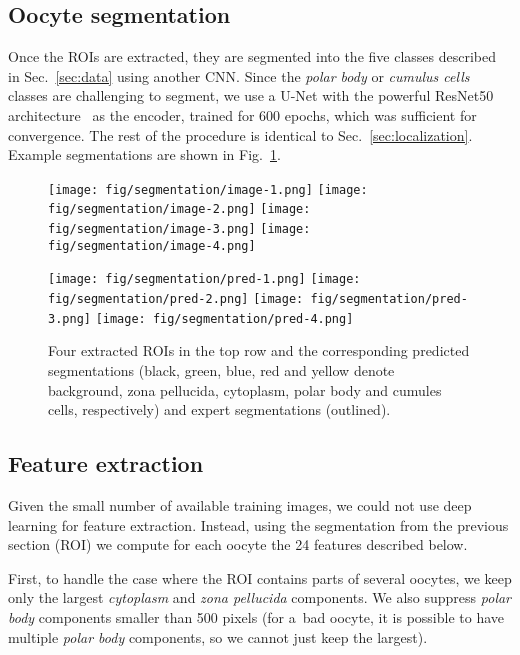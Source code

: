 \documentclass[]{spie}  %
\begin{document}
\subsection{Oocyte segmentation}
\label{sec:segmentation}

Once the ROIs are extracted, they are segmented into the five classes
described in Sec.~\ref{sec:data} using another CNN. Since the \textit{polar body} or
\textit{cumulus cells} classes are challenging to segment, we use a U-Net with the powerful
ResNet50 architecture~\cite{he2016} as the encoder, trained for 600 epochs,
which was sufficient for convergence. The rest of the procedure is identical to
Sec.~\ref{sec:localization}. Example segmentations are shown in
Fig.~\ref{fig:segmentation}.

\begin{figure}[t]
\centering
\texttt{[image: fig/segmentation/image-1.png]}
\texttt{[image: fig/segmentation/image-2.png]}
\texttt{[image: fig/segmentation/image-3.png]}
\texttt{[image: fig/segmentation/image-4.png]}

\texttt{[image: fig/segmentation/pred-1.png]}
\texttt{[image: fig/segmentation/pred-2.png]}
\texttt{[image: fig/segmentation/pred-3.png]}
\texttt{[image: fig/segmentation/pred-4.png]}
\caption{Four extracted ROIs in the top row and the corresponding predicted
segmentations (black, green, blue, red and yellow denote background, zona pellucida, cytoplasm, polar body and cumules cells, respectively) and expert segmentations (outlined).}
\label{fig:segmentation}
\end{figure}

\subsection{Feature extraction}

Given the small number of available training images, we could not use deep learning for feature extraction. Instead, using the segmentation from the previous section (ROI) we
compute for each oocyte the 24 features described below.

First, to handle the case where the ROI contains parts of several oocytes, we
keep only the largest \textit{cytoplasm} and \textit{zona pellucida} components.  We also suppress
\textit{polar body} components smaller than 500 pixels (for a~bad oocyte, it is
possible to have multiple \textit{polar body} components, so we cannot just keep the
largest).
\end{document}
